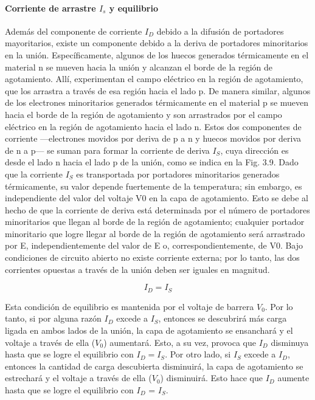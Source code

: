 \paragraph*{Corriente de arrastre $I_s$ y equilibrio} Además del componente de corriente $I_D$ debido a la difusión de portadores mayoritarios, existe un componente debido a la deriva de portadores minoritarios en la unión. Específicamente, algunos de los huecos generados térmicamente en el material n se mueven hacia la unión y alcanzan el borde de la región de agotamiento. Allí, experimentan el campo eléctrico en la región de agotamiento, que los arrastra a través de esa región hacia el lado p. De manera similar, algunos de los electrones minoritarios generados térmicamente en el material p se mueven hacia el borde de la región de agotamiento y son arrastrados por el campo eléctrico en la región de agotamiento hacia el lado n. Estos dos componentes de corriente —electrones movidos por deriva de p a n y huecos movidos por deriva de n a p— se suman para formar la corriente de deriva $I_S$, cuya dirección es desde el lado n hacia el lado p de la unión, como se indica en la Fig. 3.9. Dado que la corriente $I_S$ es transportada por portadores minoritarios generados térmicamente, su valor depende fuertemente de la temperatura; sin embargo, es independiente del valor del voltaje V0 en la capa de agotamiento. Esto se debe al hecho de que la corriente de deriva está determinada por el número de portadores minoritarios que llegan al borde de la región de agotamiento; cualquier portador minoritario que logre llegar al borde de la región de agotamiento será arrastrado por E, independientemente del valor de E o, correspondientemente, de V0.
Bajo condiciones de circuito abierto no existe corriente externa; por lo tanto, las dos corrientes opuestas a través de la unión deben ser iguales en magnitud.

\begin{equation*}
I_D = I_S
\end{equation*}

Esta condición de equilibrio es mantenida por el voltaje de barrera $V_0$. Por lo tanto, si por alguna razón $I_D$ excede a $I_S$, entonces se descubrirá más carga ligada en ambos lados de la unión, la capa de agotamiento se ensanchará y el voltaje a través de ella ($V_0$) aumentará. Esto, a su vez, provoca que $I_D$ disminuya hasta que se logre el equilibrio con $I_D= I_S$. Por otro lado, si $I_S$ excede a $I_D$, entonces la cantidad de carga descubierta disminuirá, la capa de agotamiento se estrechará y el voltaje a través de ella ($V_0$) disminuirá. Esto hace que $I_D$ aumente hasta que se logre el equilibrio con $I_D$ = $I_S$.

